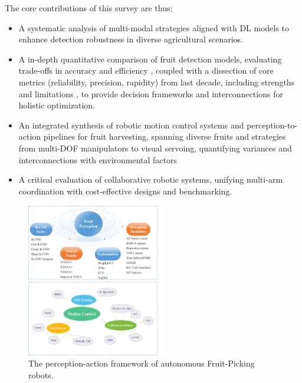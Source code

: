 \documentclass[a4paper,fleqn]{cas-dc}
\begin{document}
The core contributions of this survey are thus:
\begin{itemize}
\item A systematic analysis of multi-modal strategies aligned with DL models to enhance detection robustness in diverse agricultural scenarios.

\item A in-depth quantitative comparison of fruit detection models, evaluating trade-offs in accuracy 
 and efficiency 
, coupled with a dissection of core metrics (reliability, precision, rapidity) from last decade, including strengths 
and limitations 
, to provide decision frameworks and interconnections for holistic optimization.

\item An integrated synthesis of robotic motion control systems and perception-to-action pipelines for fruit harvesting, spanning diverse fruits and strategies from multi-DOF manipulators to visual servoing, quantifying variances 
and interconnections with environmental factors

\item A critical evaluation of collaborative robotic systems, unifying multi-arm coordination with cost-effective designs and benchmarking.
\end{itemize}

\begin{figure}[h!]
    \centering
    \includegraphics[width=0.55\textwidth]{fig_struct2.png}
    \caption{The perception-action framework of autonomous Fruit-Picking robots.}
    \label{fig:struct}
\end{figure}
\end{document}
